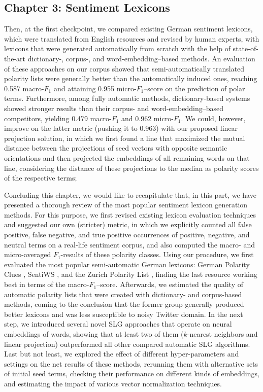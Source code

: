 \documentclass[11pt]{article}
\newcommand{\F}[0]{$F_1$}
\begin{document}
\subsection{Chapter 3: Sentiment Lexicons}

Then, at the first checkpoint, we compared existing German sentiment
lexicons, which were translated from English resources and revised by
human experts, with lexicons that were generated automatically from
scratch with the help of state-of-the-art dictionary\mbox{-,}
corpus\mbox{-,} and word-embedding--based methods.  An evaluation of
these approaches on our corpus showed that semi-automatically
translated polarity lists were generally better than the automatically
induced ones, reaching 0.587 macro-\F{} and attaining 0.955
micro-\F{}--score on the prediction of polar terms.  Furthermore,
among fully automatic methods, dictionary-based systems showed
stronger results than their corpus- and word-embedding--based
competitors, yielding 0.479 macro-\F{} and 0.962 micro-\F{}.  We
could, however, improve on the latter metric (pushing it to 0.963)
with our proposed linear projection solution, in which we first found
a line that maximized the mutual distance between the projections of
seed vectors with opposite semantic orientations and then projected
the embeddings of all remaining words on that line, considering the
distance of these projections to the median as polarity scores of the
respective terms;

Concluding this chapter, we would like to recapitulate that, in this
part, we have presented a thorough review of the most popular
sentiment lexicon generation methods.  For this purpose, we first
revised existing lexicon evaluation techniques and suggested our own
(stricter) metric, in which we explicitly counted all false positive,
false negative, and true positive occurrences of positive, negative,
and neutral terms on a real-life sentiment corpus, and also computed
the macro- and micro-averaged \F-results of these polarity classes.
Using our procedure, we first evaluated the most popular
semi-automatic German lexicons: German Polarity Clues
\cite{Waltinger:10}, SentiWS \cite{Remus:10}, and the Zurich Polarity
List \cite{Clematide:10}, finding the last resource working best in
terms of the macro-\F--score.  Afterwards, we estimated the quality of
automatic polarity lists that were created with dictionary- and
corpus-based methods, coming to the conclusion that the former group
generally produced better lexicons and was less susceptible to noisy
Twitter domain.  In the next step, we introduced several novel SLG
approaches that operate on neural embeddings of words, showing that at
least two of them ($k$-nearest neighbors and linear projection)
outperformed all other compared automatic SLG algorithms.  Last but
not least, we explored the effect of different hyper-parameters and
settings on the net results of these methods, rerunning them with
alternative sets of initial seed terms, checking their performance on
different kinds of embeddings, and estimating the impact of various
vector normalization techniques.
\end{document}
